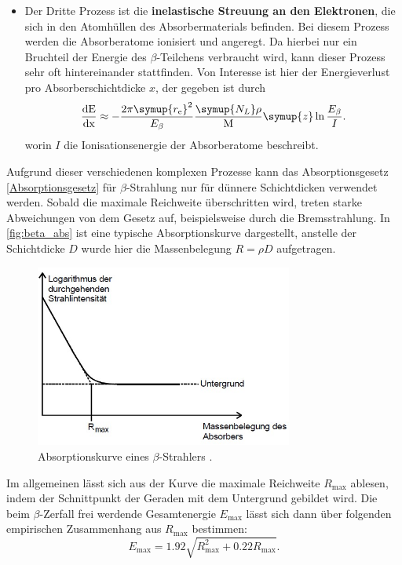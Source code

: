 \begin{itemize}
    \item Der Dritte Prozess ist die \textbf{inelastische Streuung an den Elektronen}, die sich in den Atomhüllen des
    Absorbermaterials befinden. Bei diesem Prozess werden die Absorberatome ionisiert und angeregt.
    Da hierbei nur ein Bruchteil der Energie des $\beta$-Teilchens verbraucht wird, kann dieser Prozess sehr oft
    hintereinander stattfinden.
    Von Interesse ist hier der Energieverlust pro Absorberschichtdicke $x$, der gegeben ist durch
    \begin{equation}
        \label{dEdx}
        \frac{\text{dE}}{\text{dx}} \approx -\frac{2\pi \symup{r_{\text{e}}}^2}{E_\beta}\frac{\symup{N_L}\rho}{\text{M}} \symup{z} \ln{\frac{E_\beta}{I}}.
    \end{equation}
    worin $I$ die Ionisationsenergie der Absorberatome beschreibt.
\end{itemize}

Aufgrund dieser verschiedenen komplexen Prozesse kann das Absorptionsgesetz \eqref{Absorptionsgesetz} für $\beta$-Strahlung
nur für dünnere Schichtdicken verwendet werden.
Sobald die maximale Reichweite überschritten wird, treten starke Abweichungen von dem Gesetz auf, beispielsweise
durch die Bremsstrahlung.
In \autoref{fig:beta_abs} ist eine typische Absorptionskurve dargestellt, anstelle der Schichtdicke $D$ wurde hier
die Massenbelegung $R=\rho D$ aufgetragen.
\begin{figure}[H]
    \centering
    \includegraphics[height=6cm]{content/pics/beta_absorption.jpg}
    \caption{Absorptionskurve eines $\beta$-Strahlers \cite{v704}.}
    \label{fig:beta_abs}
\end{figure}
Im allgemeinen lässt sich aus der Kurve die maximale Reichweite $R_{\text{max}}$ ablesen, indem der Schnittpunkt
der Geraden mit dem Untergrund gebildet wird.
Die beim $\beta$-Zerfall frei werdende Gesamtenergie $E_{\text{max}}$ lässt sich dann über folgenden empirischen
Zusammenhang aus $R_{\text{max}}$ bestimmen:
\begin{equation}
    \label{e_max}
    E_{\text{max}} = 1.92\sqrt{R_{\text{max}}^2 + 0.22R_{\text{max}}}.
\end{equation}

